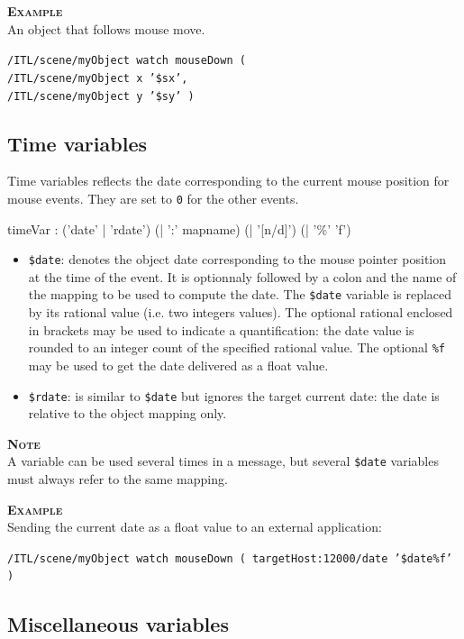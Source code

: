 \documentclass[a4paper,twoside]{report}
\newcommand{\subsublevel}[1]	{\subsection{#1}}
\newcommand{\OSC}[1]		{\texttt{#1}}
\newcommand{\values}[1]	{\texttt{#1}}
\newcommand{\example}		{\textbf{\hspace{-1.5cm}\textbf{\textsc{Example }}}}
\newcommand{\note}	[1]		{\vspace{2mm}\textbf{\hspace{-1.03cm}\textbf{\textsc{Note #1}}}}
\newcommand{\sample}	[1]			{\vspace{-2mm}\begin{center}\colorbox{mygrey}{
								\begin{minipage}[t]{0.9\columnwidth} 
								{\small \texttt{#1}}
								\end{minipage}}\end{center}}
\begin{document}
\example \\
An object that follows mouse move.\\
\sample{/ITL/scene/myObject watch mouseDown ( \\
\hspace*{3cm}/ITL/scene/myObject x '\$sx', \\
\hspace*{3cm}/ITL/scene/myObject y '\$sy' )}


\subsublevel{Time variables}
\label{timevar}

Time variables reflects the date corresponding to the current mouse position for mouse events. 
They are set to \values{0} for the other events. 

\begin{rail} 
timeVar :  ('date' | 'rdate') (| ':'  mapname) (| '[n/d]') (| '\%' 'f')
\end{rail}

\begin{itemize}
\item \OSC{\$date}: denotes the object date corresponding to the mouse pointer position at the time of the event. It is optionnaly followed by a colon and the name of the mapping to be used to compute the date. The \OSC{\$date} variable is replaced by its rational value (i.e. two integers values). The optional rational enclosed in brackets may be used to indicate a quantification: the date value is rounded to an integer count of the specified rational value. The optional \OSC{\%f} may be used to get the date delivered as a float value.
\item \OSC{\$rdate}: is similar to \OSC{\$date} but ignores the target current date: the date is relative to the object mapping only.
\end{itemize}

\note{} \\
A variable can be used several times in a message, but several \OSC{\$date} variables must always refer to the same mapping.

\example \\
Sending the current date as a float value to an external application:\\
\sample{/ITL/scene/myObject watch mouseDown ( targetHost:12000/date '\$date\%f' )}

\subsublevel{Miscellaneous variables}
\label{miscvar}
\end{document}
